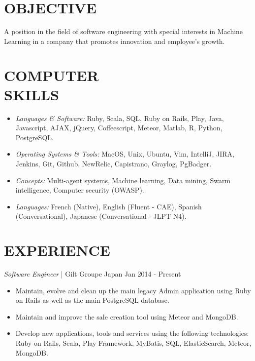 \documentclass[line, margin]{res}
\begin{document}
\address{ 151-0051 Tokyo, Shibuya, Sendagaya 3-7-8 Urbanex Harajuku 605 }
\address{ abalonperin1@gmail.com | https://linkedin.com/in/abalonperin | https://github.com/zolrag13 }
 
\begin{resume}
 
\section{OBJECTIVE} A position in the field of software engineering with special interests in Machine Learning in a
company that promotes innovation and employee's growth. 
 
\section{COMPUTER \\ SKILLS}
                 \begin{itemize} %
                  \item {\sl Languages \& Software:} Ruby, Scala, SQL, Ruby on Rails, Play, Java, Javascript, AJAX, jQuery, Coffeescript, Meteor, Matlab, R, Python, PostgreSQL.
                  \item {\sl Operating Systems \& Tools:} MacOS, Unix, Ubuntu, Vim, IntelliJ, JIRA, Jenkins, Git,
                    Github, NewRelic, Capistrano, Graylog, PgBadger.
                  \item {\sl Concepts:} Multi-agent systems, Machine learning, Data mining, Swarm intelligence, Computer security (OWASP).
                  \item {\sl Languages:} French (Native), English (Fluent - CAE), Spanish (Conversational), Japanese (Conversational - JLPT N4).
                \end{itemize}
 
\section{EXPERIENCE} {\sl Software Engineer} | Gilt Groupe Japan \hfill Jan 2014 - Present\\
                 \begin{itemize} %
                  \item  Maintain, evolve and clean up the main legacy Admin application using Ruby on Rails as well as the main PostgreSQL database.
                  \item  Maintain and improve the sale creation tool using Meteor and MongoDB.
                  \item  Develop new applications, tools and services using the following technologies: Ruby on Rails, Scala, Play Framework, MyBatis, SQL, ElasticSearch, Meteor, MongoDB.
                 \end{itemize}
 

\end{resume}
\end{document}
